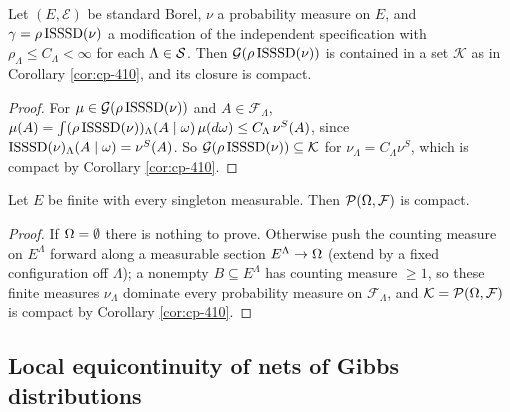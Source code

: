 \begin{example}[Georgii (4.11)(1)]
    \label{ex:cp-411-1}
    \leanok

    Let $(E, \mathcal{E})$ be standard Borel, $\nu$ a probability measure on $E$, and
    $\gamma = \rho\operatorname{ISSSD}(\nu)$ a modification of the independent specification with
    $\rho_\Lambda \leq C_\Lambda < \infty$ for each $\Lambda \in \mathcal{S}$. Then
    $\mathcal{G}(\rho\operatorname{ISSSD}(\nu))$ is contained in a set $\mathcal{K}$ as in
    Corollary \ref{cor:cp-410}, and its closure is compact.
\end{example}
\begin{proof}
    \leanok

    For $\mu \in \mathcal{G}(\rho\operatorname{ISSSD}(\nu))$ and $A \in \mathcal{F}_\Lambda$,
    $\mu(A) = \int (\rho\operatorname{ISSSD}(\nu))_\Lambda(A \mid \omega)\, \mu(d\omega)
    \leq C_\Lambda\, \nu^S(A)$, since $\operatorname{ISSSD}(\nu)_\Lambda(A \mid \omega) = \nu^S(A)$. So
    $\mathcal{G}(\rho\operatorname{ISSSD}(\nu)) \subseteq \mathcal{K}$ for $\nu_\Lambda = C_\Lambda \nu^S$, which is
    compact by Corollary \ref{cor:cp-410}.
\end{proof}

\begin{example}[Georgii (4.11)(2)]
    \label{ex:cp-411-2}
    \leanok

    Let $E$ be finite with every singleton measurable. Then $\mathcal{P}(\Omega, \mathcal{F})$ is
    compact.
\end{example}
\begin{proof}
    \leanok

    If $\Omega = \emptyset$ there is nothing to prove. Otherwise push the counting measure on
    $E^\Lambda$ forward along a measurable section $E^\Lambda \to \Omega$ (extend by a fixed
    configuration off $\Lambda$); a nonempty $B \subseteq E^\Lambda$ has counting measure
    $\geq 1$, so these finite measures $\nu_\Lambda$ dominate every probability measure on
    $\mathcal{F}_\Lambda$, and $\mathcal{K} = \mathcal{P}(\Omega, \mathcal{F})$ is compact by
    Corollary \ref{cor:cp-410}.
\end{proof}

\subsection*{Local equicontinuity of nets of Gibbs distributions}

